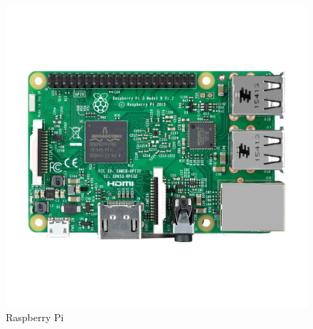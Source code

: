 \paragraph{}
\begin{figure}[H]
	\centering
	\includegraphics[scale=.26]{Capitulo2/images/raspberry.png}
	\caption{Raspberry Pi}
	\label{fig:diagrama_dispMonitoreo}
\end{figure}

